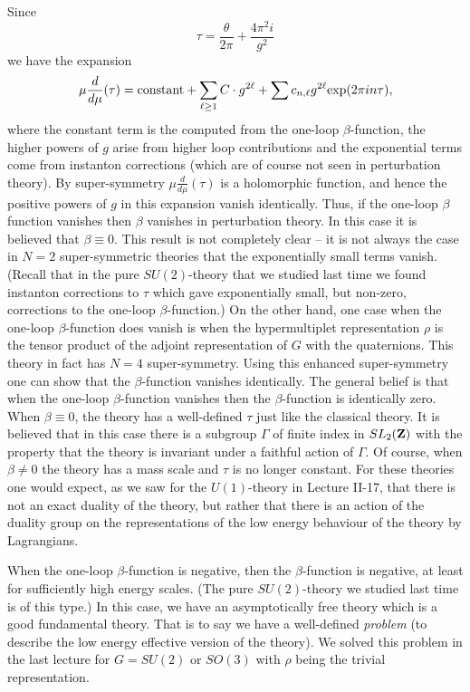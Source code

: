 \documentclass[10pt]{article}
\begin{document}
Since
$$\tau=\frac{\theta}{2\pi}+\frac{4\pi^2i}{g^2}$$
we have the expansion
$$\mu\frac{d}{d\mu}(\tau)={\rm constant}+\sum_{\ell\ge 1}C\cdot
g^{2\ell}+ \sum c_{n,\ell}g^{2\ell}{\rm exp}(2\pi in \tau),$$
where the constant term is the computed from the one-loop
$\beta$-function,  the higher powers of $g$ arise from higher loop
contributions and the exponential terms come from instanton
corrections (which are of course not seen in perturbation theory).
By super-symmetry $\mu\frac{d}{d\mu}(\tau)$ is a  holomorphic
function, and hence the  positive   powers of $g$ in 
this expansion vanish identically. Thus, if the one-loop $\beta$
function vanishes then $\beta$ vanishes in perturbation theory.
In this case it is believed that $\beta\equiv 0$.  
This result is not completely clear -- it is not always the case in
$N=2$ super-symmetric theories that
the exponentially small terms vanish. (Recall that in the pure
$SU(2)$-theory that we studied last time we found instanton
corrections to $\tau$ which gave exponentially small, but non-zero,
corrections to 
the one-loop $\beta$-function.) On the other hand, one case when the
one-loop $\beta$-function does vanish is when the hypermultiplet
representation $\rho$ is the tensor product of the adjoint
representation of $G$ with the quaternions.  This theory in fact has
$N=4$ super-symmetry. Using this enhanced super-symmetry one can show
that the $\beta$-function vanishes identically. The general belief is
that when the one-loop $\beta$-function vanishes then the
$\beta$-function is identically zero.
When $\beta\equiv 0$, the theory has a well-defined $\tau$ just like
the classical theory. It is believed that in this case there is a
subgroup $\Gamma$ 
of finite index in $SL_2({\bf Z})$  with the
property that the theory 
is invariant under a faithful action of $\Gamma$. Of course, when
$\beta\not= 0$ the theory has a mass scale and $\tau$ is no longer
constant. For these theories one would expect, as we saw for the
$U(1)$-theory in Lecture II-17, that there is not an exact duality
of the theory, but rather that there is an action of the duality group
on the representations of the low energy behaviour of the theory by
Lagrangians. 


When the one-loop $\beta$-function is negative, then the
$\beta$-function is negative, at least for sufficiently high energy
scales.  (The pure $SU(2)$-theory we studied last time is of this
type.) In this case, we have an asymptotically free theory which is a 
good fundamental theory.  That is to say we have a well-defined
{\sl problem} (to describe the low energy effective version of the
theory). We solved this problem in the last 
lecture for $G=SU(2)$ or $SO(3)$ with $\rho$ being the trivial
representation. 
\end{document}
